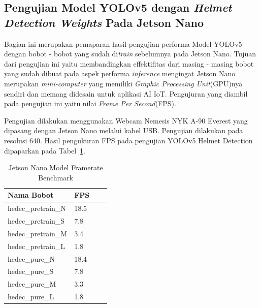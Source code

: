 \subsection{Pengujian Model YOLOv5 dengan \emph{Helmet Detection Weights} Pada Jetson Nano}
\label{sec:jetsonnano_hedectest}

\par Bagian ini merupakan pemaparan hasil pengujian performa Model YOLOv5 dengan bobot - bobot yang sudah di\emph{train}
sebelumnya pada Jetson Nano. Tujuan dari pengujian ini yaitu membandingkan effektifitas dari masing - masing
bobot yang sudah dibuat pada aspek performa \emph{inference} mengingat Jetson Nano merupakan \emph{mini-computer} yang memiliki
\emph{Graphic Processing Unit}(GPU)nya sendiri dan memang didesain untuk aplikasi AI IoT. Pengujuran yang diambil pada pengujian ini
yaitu nilai \emph{Frame Per Second}(FPS).

 
\par Pengujian dilakukan menggunakan Webcam Nemesis NYK A-90 Everest yang dipasang dengan Jetson Nano melalui kabel USB. 
Pengujian dilakukan pada resolusi 640. Hasil pengukuran FPS pada pengujian YOLOv5 Helmet Detection dipaparkan pada Tabel~\ref{tb:jetsonano_model_benchmark}.

\begin{table}
  \centering
  \caption{Jetson Nano Model Framerate Benchmark}
  \label{tb:jetsonano_model_benchmark}
  \begin{tabular}{|l|l|l|l|} 
    \hline
    \textbf{Nama Bobot} & \textbf{FPS}      \\ 
    \hline
    hedec\_pretrain\_N                             & 18.5          \\
    hedec\_pretrain\_S                             & 7.8           \\
    hedec\_pretrain\_M                           & 3.4           \\
    hedec\_pretrain\_L                            & 1.8           \\
    hedec\_pure\_N                              & 18.4          \\
    hedec\_pure\_S                              & 7.8           \\
    hedec\_pure\_M                              & 3.3           \\
    hedec\_pure\_L                                 & 1.8           \\
    \hline
  \end{tabular}
\end{table}


